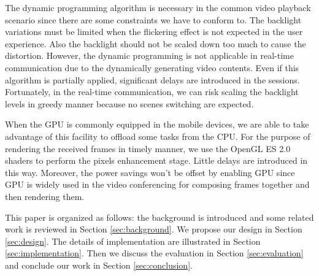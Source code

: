 The dynamic programming algorithm is necessary in the common video
playback scenario since there are some constraints we have to conform
to. The backlight variations must be limited when the flickering
effect is not expected in the user experience. Also the backlight
should not be scaled down too much to cause the distortion. However,
the dynamic programming is not applicable in real-time communication
due to the dynamically generating video contents. Even if this
algorithm is partially applied, significant delays are introduced in
the sessions. Fortunately, in the real-time communication, we can risk
scaling the backlight levels in greedy manner because no scenes
switching are expected. 

When the GPU is commonly equipped in the mobile devices, we are able
to take advantage of this facility to offload some tasks from the
CPU. For the purpose of rendering the received frames in timely
manner, we use the OpenGL ES 2.0 shaders to perform the pixels
enhancement stage. Little delays are introduced in this way. Moreover,
the power savings won't be offset by enabling GPU since GPU is widely
used in the video conferencing for composing frames together and then
rendering them.

This paper is organized as follows: the background is introduced and
some related work is reviewed in Section \ref{sec:background}. We propose
our design in Section \ref{sec:design}. The details of implementation
are illustrated in Section \ref{sec:implementation}. Then we discuss
the evaluation in Section \ref{sec:evaluation} and conclude our work
in Section \ref{sec:conclusion}.
\fi






